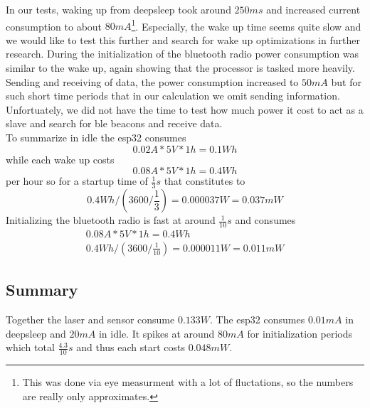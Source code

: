 In our tests, waking up from deepsleep took around $250ms$ and increased current consumption to about $80mA$\footnote{This was done via eye measurment with a lot of fluctations, so the numbers are really only approximates.}. Especially, the wake up time seems quite slow and we would like to test this further and search for wake up optimizations in further research.
During the initialization of the bluetooth radio power consumption was similar to the wake up, again showing that the processor is tasked more heavily. Sending and receiving of data, the power consumption increased to $50mA$ but for such short time periods that in our calculation we omit sending information. Unfortuately, we did not have the time to test how much power it cost to act as a slave and search for ble beacons and receive data.\\

To summarize in idle the esp32 consumes
\begin{equation*}
    0.02A * 5V *1h= 0.1Wh
\end{equation*}
while each wake up costs
\begin{equation*}
    0.08A * 5V *1h= 0.4Wh
\end{equation*}
per hour so for a startup time of $\frac{1}{3}s$  that constitutes to 
\begin{equation*}
    0.4Wh / (3600 / \frac{1}{3}) = 0.000037W = 0.037mW
\end{equation*}
Initializing the bluetooth radio is fast at around $\frac{1}{10}s$ and consumes 
\begin{gather*}
        0.08A * 5V * 1h = 0.4Wh \\
        0.4Wh / (3600 / \frac{1}{10}) = 0.000011W = 0.011mW 
\end{gather*}

\subsection{Summary}
Together the laser and sensor consume $0.133W$. The esp32 consumes $0.01mA$ in deepsleep and $20mA$ in idle. It spikes at around $80mA$ for initialization periods which total $\frac{4.3}{10}s$ and thus each start costs $0.048mW$.
